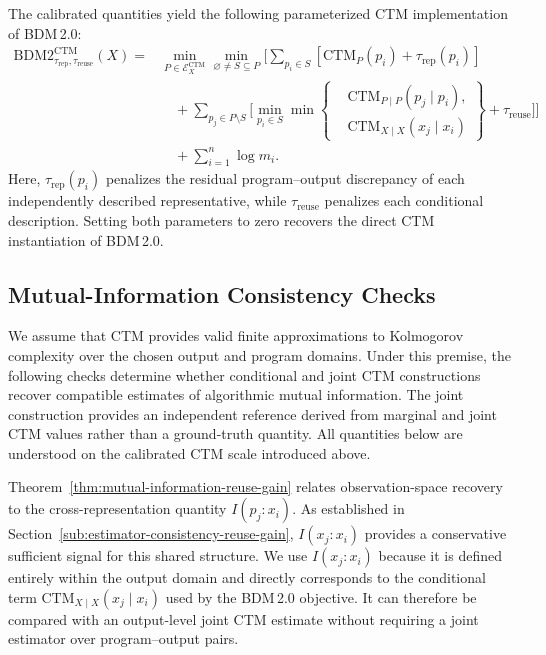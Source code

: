 \documentclass{article}
\begin{document}
The calibrated quantities yield the following parameterized CTM implementation of BDM\,2.0:
\[
\begin{aligned}
\mathrm{BDM2}_{\tau_{\mathrm{rep}},\tau_{\mathrm{reuse}}}^{\mathrm{CTM}}(X)
={}&
\min_{P\in\mathcal E_X^{\mathrm{CTM}}}
\min_{\varnothing\neq S\subseteq P}
\Bigg[
\sum_{p_i\in S}
\left[
\mathrm{CTM}_{P}(p_i)
+
\tau_{\mathrm{rep}}(p_i)
\right]
\\
&\quad+
\sum_{p_j\in P\setminus S}
\Bigg[
\min_{p_i\in S}
\min
\left\{
\begin{aligned}
&\mathrm{CTM}_{P\mid P}(p_j\mid p_i),\\
&\mathrm{CTM}_{X\mid X}(x_j\mid x_i)
\end{aligned}
\right\}
+
\tau_{\mathrm{reuse}}
\Bigg]
\Bigg]
\\
&\quad+
\sum_{i=1}^{n}\log m_i.
\end{aligned}
\]
Here, \(\tau_{\mathrm{rep}}(p_i)\) penalizes the residual program--output discrepancy of each independently described representative, while \(\tau_{\mathrm{reuse}}\) penalizes each conditional description. Setting both parameters to zero recovers the direct CTM instantiation of BDM\,2.0.

\subsection{Mutual-Information Consistency Checks}

We assume that CTM provides valid finite approximations to Kolmogorov complexity over the chosen output and program domains. Under this premise, the following checks determine whether conditional and joint CTM constructions recover compatible estimates of algorithmic mutual information. The joint construction provides an independent reference derived from marginal and joint CTM values rather than a ground-truth quantity. All quantities below are understood on the calibrated CTM scale introduced above.

Theorem~\ref{thm:mutual-information-reuse-gain} relates observation-space recovery to the cross-representation quantity \(I(p_j:x_i)\). As established in Section~\ref{sub:estimator-consistency-reuse-gain}, \(I(x_j:x_i)\) provides a conservative sufficient signal for this shared structure. We use \(I(x_j:x_i)\) because it is defined entirely within the output domain and directly corresponds to the conditional term \(\mathrm{CTM}_{X\mid X}(x_j\mid x_i)\) used by the BDM\,2.0 objective. It can therefore be compared with an output-level joint CTM estimate without requiring a joint estimator over program--output pairs.
\end{document}
